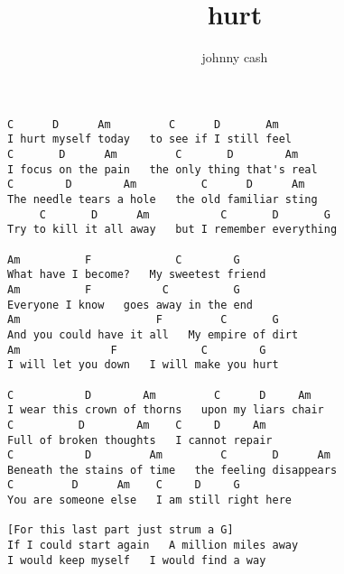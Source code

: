 \author{johnny cash}
\title{hurt}
\maketitle
\begin{verbatim}
C      D      Am         C      D       Am
I hurt myself today   to see if I still feel
C       D      Am         C       D        Am
I focus on the pain   the only thing that's real
C        D        Am          C      D      Am
The needle tears a hole   the old familiar sting
     C       D      Am           C       D       G          
Try to kill it all away   but I remember everything

Am          F             C        G
What have I become?   My sweetest friend
Am          F           C          G
Everyone I know   goes away in the end
Am                     F         C       G
And you could have it all   My empire of dirt
Am              F             C        G
I will let you down   I will make you hurt

C           D        Am         C      D     Am
I wear this crown of thorns   upon my liars chair
C          D        Am    C     D     Am
Full of broken thoughts   I cannot repair
C           D         Am         C       D      Am
Beneath the stains of time   the feeling disappears
C         D      Am    C     D     G
You are someone else   I am still right here

[For this last part just strum a G]
If I could start again   A million miles away
I would keep myself   I would find a way
\end{verbatim}